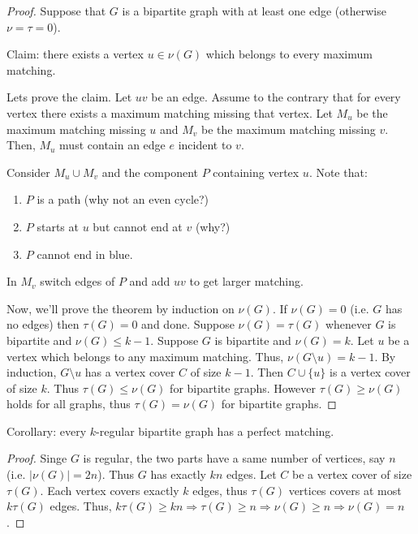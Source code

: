 \documentclass[12pt,a4paper]{article}
\begin{document}
\begin{proof}
  Suppose that \(G\) is a bipartite graph with at least one edge (otherwise
  \(\nu = \tau = 0\)).

  Claim: there exists a vertex \(u \in \nu(G)\) which belongs to every maximum
  matching.

  Lets prove the claim.  Let \(uv\) be an edge.  Assume to the contrary that for
  every vertex there exists a maximum matching missing that vertex.  Let \(M_u\)
  be the maximum matching missing \(u\) and \(M_v\) be the maximum matching
  missing \(v\).  Then, \(M_u\) must contain an edge \(e\) incident to \(v\).

  Consider \(M_u \cup M_v\) and the component \(P\) containing vertex \(u\).
  Note that:
  \begin{enumerate}
  \item \(P\) is a path (why not an even cycle?)
  \item \(P\) starts at \(u\) but cannot end at \(v\) (why?)
  \item \(P\) cannot end in blue.
  \end{enumerate}
  In \(M_v\) switch edges of \(P\) and add \(uv\) to get larger matching.

  Now, we'll prove the theorem by induction on \(\nu(G)\).  If \(\nu(G)=0\)
  (i.e. \(G\) has no edges) then \(\tau(G)=0\) and done.  Suppose
  \(\nu(G) = \tau(G)\) whenever \(G\) is bipartite and \(\nu(G) \leq k - 1\).
  Suppose \(G\) is bipartite and \(\nu(G) = k\).  Let \(u\) be a vertex which
  belongs to any maximum matching.  Thus, \(\nu(G\setminus u) = k - 1\).  By
  induction, \(G\setminus u\) has a vertex cover \(C\) of size \(k - 1\).  Then
  \(C \cup \{u\}\) is a vertex cover of size \(k\).  Thus
  \(\tau(G) \leq \nu(G)\) for bipartite graphs.  However \(\tau(G) \geq \nu(G)\)
  holds for all graphs, thus \(\tau(G) = \nu(G)\) for bipartite graphs.
\end{proof}

Corollary: every \(k\)-regular bipartite graph has a perfect matching.
\begin{proof}
  Singe \(G\) is regular, the two parts have a same number of vertices, say
  \(n\) (i.e. \(|\nu(G)|=2n\)).  Thus \(G\) has exactly \(kn\) edges.  Let \(C\)
  be a vertex cover of size \(\tau(G)\).  Each vertex covers exactly \(k\)
  edges, thus \(\tau(G)\) vertices covers at most \(k \tau(G)\) edges.  Thus,
  \(k \tau(G) \geq k n \Rightarrow \tau(G) \geq n \Rightarrow \nu(G) \geq n
  \Rightarrow \nu(G) = n\).
\end{proof}
\end{document}
